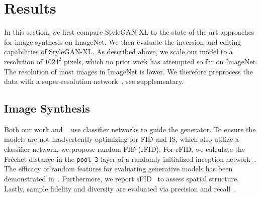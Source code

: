 \section{Results}
\label{sec:results}
In this section, we first compare StyleGAN-XL to the state-of-the-art approaches for image synthesis on ImageNet. We then evaluate the inversion and editing capabilities of StyleGAN-XL. As described above, we scale our model to a resolution of $1024^2$ pixels, which no prior work has attempted so far on ImageNet. The resolution of most images in ImageNet is lower. We therefore preprocess the data with a super-resolution network~\cite{Liang2021ICCV}, see supplementary.

\subsection{Image Synthesis}
Both our work and ~\cite{Dhariwal2021NEURIPS} use classifier networks to guide the generator. To ensure the models are not inadvertently optimizing for FID and IS, which also utilize a classifier network, we propose random-FID (rFID). For rFID, we calculate the Fr\'echet distance in the \texttt{pool\_3} layer of a randomly initialized inception network~\cite{Szegedy2015CVPR}.
The efficacy of random features for evaluating generative models has been demonstrated in~\cite{Naeem2020ICML}. Furthermore, we report sFID~\cite{Nash2021ICML} to assess spatial structure.
Lastly, sample fidelity and diversity are evaluated via precision and  recall~\cite{Kynknniemi2019NEURIPS}. 

